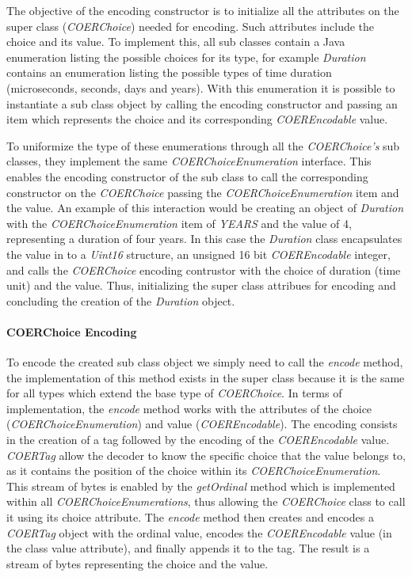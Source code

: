 The objective of the encoding constructor is to initialize all the attributes on the super class (\textit{COERChoice}) needed for encoding. Such attributes include the choice and its value. To implement this, all sub classes contain a Java enumeration listing the possible choices for its type, for example \textit{Duration} contains an enumeration listing the possible types of time duration (microseconds, seconds, days and years). With this enumeration it is possible to instantiate a sub class object by calling the encoding constructor and passing an item which represents the choice and its corresponding \textit{COEREncodable} value. 

To uniformize the type of these enumerations through all the \textit{COERChoice's} sub classes, they implement the same \textit{COERChoiceEnumeration} interface. This enables the encoding constructor of the sub class to call the corresponding constructor on the \textit{COERChoice} passing the \textit{COERChoiceEnumeration} item and the value. An example of this interaction would be creating an object of \textit{Duration} with the \textit{COERChoiceEnumeration} item of \textit{YEARS} and the value of 4, representing a duration of four years. In this case the \textit{Duration} class encapsulates the value in to a \textit{Uint16} structure, an unsigned 16 bit \textit{COEREncodable} integer, and calls the \textit{COERChoice} encoding contrustor with the choice of duration (time unit) and the value. Thus, initializing the super class attribues for encoding and concluding the creation of the \textit{Duration} object. 


\paragraph{COERChoice Encoding}
To encode the created sub class object we simply need to call the \textit{encode} method, the implementation of this method exists in the super class because it is the same for all types which extend the base type of \textit{COERChoice}. In terms of implementation, the \textit{encode} method works with the attributes of the choice (\textit{COERChoiceEnumeration}) and value (\textit{COEREncodable}). The encoding consists in the creation of a tag followed by the encoding of the \textit{COEREncodable} value. \textit{COERTag} allow the decoder to know the specific choice that the value belongs to, as it contains the position of the choice within its \textit{COERChoiceEnumeration}. This stream of bytes is enabled by the \textit{getOrdinal} method which is implemented within all \textit{COERChoiceEnumerations}, thus allowing the \textit{COERChoice} class to call it using its choice attribute. The \textit{encode} method then creates and encodes a \textit{COERTag} object with the ordinal value, encodes the \textit{COEREncodable} value (in the class value attribute), and finally appends it to the tag. The result is a stream of bytes representing the choice and the value.

